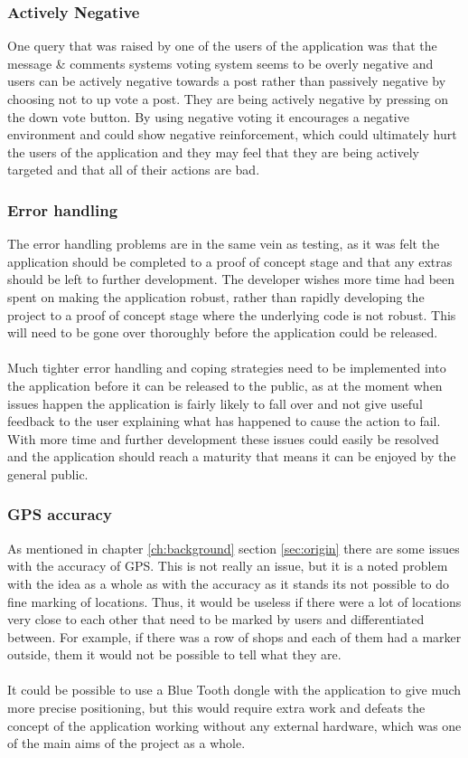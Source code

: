 \subsubsection{Actively Negative}

One query that was raised by one of the users of the application was that the message \& comments systems voting system seems to be overly negative and users can be actively negative towards a post rather than passively negative by choosing not to up vote a post. They are being actively negative by pressing on the down vote button. By using negative voting it encourages a negative environment and could show negative reinforcement, which could ultimately hurt the users of the application and they may feel that they are being actively targeted and that all of their actions are bad.

\subsubsection{Error handling}

The error handling problems are in the same vein as testing, as it was felt the application should be completed to a proof of concept stage and that any extras should be left to further development. The developer wishes more time had been spent on making the application robust, rather than rapidly developing the project to a proof of concept stage where the underlying code is not robust. This will need to be gone over thoroughly before the application could be released.\\
\\
Much tighter error handling and coping strategies need to be implemented into the application before it can be released to the public, as at the moment when issues happen the application is fairly likely to fall over and not give useful feedback to the user explaining what has happened to cause the action to fail. With more time and further development these issues could easily be resolved and the application should reach a maturity that means it can be enjoyed by the general public.

\subsubsection{GPS accuracy}

As mentioned in chapter \ref{ch:background} section \ref{sec:origin} there are some issues with the accuracy of GPS. This is not really an issue, but it is a noted problem with the idea as a whole as with the accuracy as it stands its not possible to do fine marking of locations. Thus, it would be useless if there were a lot of locations very close to each other that need to be marked by users and differentiated between. For example, if there was a row of shops and each of them had a marker outside, them it would not be possible to tell what they are.\\
\\
It could be possible to use a Blue Tooth dongle with the application to give much more precise positioning, but this would require extra work and defeats the concept of the application working without any external hardware, which was one of the main aims of the project as a whole.


